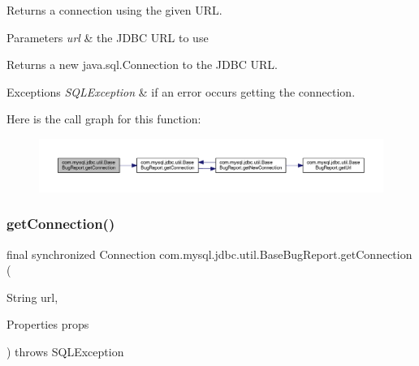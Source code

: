 Returns a connection using the given U\+RL.


\begin{DoxyParams}{Parameters}
{\em url} & the J\+D\+BC U\+RL to use \\
\hline
\end{DoxyParams}
\begin{DoxyReturn}{Returns}
a new java.\+sql.\+Connection to the J\+D\+BC U\+RL. 
\end{DoxyReturn}

\begin{DoxyExceptions}{Exceptions}
{\em S\+Q\+L\+Exception} & if an error occurs getting the connection. \\
\hline
\end{DoxyExceptions}
Here is the call graph for this function\+:
\nopagebreak
\begin{figure}[H]
\begin{center}
\leavevmode
\includegraphics[width=350pt]{classcom_1_1mysql_1_1jdbc_1_1util_1_1_base_bug_report_ab8d73bffa10b18d975d64bde434fe4b7_cgraph}
\end{center}
\end{figure}
\mbox{\label{classcom_1_1mysql_1_1jdbc_1_1util_1_1_base_bug_report_a23d83d1297142eb136a1898cb339b77a}} 
\subsubsection{\texorpdfstring{get\+Connection()}{getConnection()}\hspace{0.1cm}{\footnotesize\ttfamily [3/3]}}
{\footnotesize\ttfamily final synchronized Connection com.\+mysql.\+jdbc.\+util.\+Base\+Bug\+Report.\+get\+Connection (\begin{DoxyParamCaption}\item[{String}]{url,  }\item[{Properties}]{props }\end{DoxyParamCaption}) throws S\+Q\+L\+Exception}

